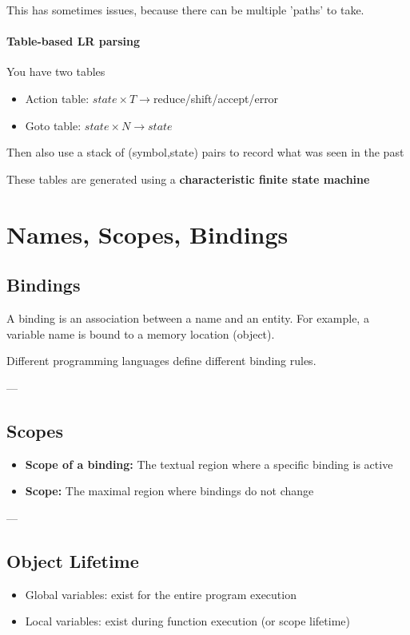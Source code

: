 \documentclass{article}
\begin{document}
This has sometimes issues, because there can be multiple 'paths' to take.

\paragraph{Table-based LR parsing} You have two tables
\begin{itemize}
  \item Action table: $state \times T \to $reduce/shift/accept/error
  \item Goto table: $state \times N \to state$
\end{itemize}
Then also use a stack of (symbol,state) pairs to record what was seen in the past

These tables are generated using a \textbf{characteristic finite state machine}

\section{Names, Scopes, Bindings}

\subsection{Bindings}
A binding is an association between a name and an entity.  
For example, a variable name is bound to a memory location (object).

Different programming languages define different binding rules.

---

\subsection{Scopes}
\begin{itemize}
  \item \textbf{Scope of a binding:} The textual region where a specific binding is active
  \item \textbf{Scope:} The maximal region where bindings do not change
\end{itemize}

---

\subsection{Object Lifetime}
\begin{itemize}
  \item Global variables: exist for the entire program execution
  \item Local variables: exist during function execution (or scope lifetime)
\end{itemize}
\end{document}
